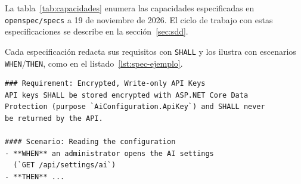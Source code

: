 \label{ap:especificaciones}

La tabla~\ref{tab:capacidades} enumera las capacidades especificadas en \texttt{openspec/specs} a 19 de noviembre de 2026. El ciclo de trabajo con estas especificaciones se describe en la sección~\ref{sec:sdd}.

Cada especificación redacta sus requisitos con \texttt{SHALL} y los ilustra con escenarios \texttt{WHEN}/\texttt{THEN}, como en el listado~\ref{lst:spec-ejemplo}.

\begin{lstlisting}[caption={Fragmento de \texttt{openspec/specs/user-api-keys-vault/spec.md}},label={lst:spec-ejemplo}]
### Requirement: Encrypted, Write-only API Keys
API keys SHALL be stored encrypted with ASP.NET Core Data
Protection (purpose `AiConfiguration.ApiKey`) and SHALL never
be returned by the API.

#### Scenario: Reading the configuration
- **WHEN** an administrator opens the AI settings
  (`GET /api/settings/ai`)
- **THEN** ...
\end{lstlisting}


